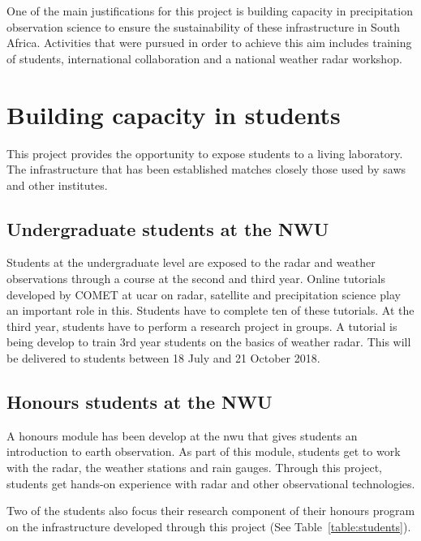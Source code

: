 \documentclass{wrcreport}
\begin{document}
One of the main justifications for this project is building capacity in precipitation observation science to ensure the sustainability of these infrastructure in South Africa. Activities that were pursued in order to achieve this aim includes training of students, international collaboration and a national weather radar workshop.

\section{Building capacity in students}

This project provides the opportunity to expose students to a living laboratory. The infrastructure that has been established matches closely those used by \gls{saws} and other institutes. 

\subsection{Undergraduate students at the NWU}

Students at the undergraduate level are exposed to the radar and weather observations through a course at the second and third year. Online tutorials developed by COMET at \gls{ucar} on radar, satellite and precipitation science play an important role in this. Students have to complete ten of these tutorials. At the third year, students have to perform a research project in groups. A tutorial is being develop to train 3rd year students on the basics of weather radar. This will be delivered to students between 18 July and 21 October 2018.

\subsection{Honours students at the NWU}

A honours module has been develop at the \gls{nwu} that gives students an introduction to earth observation. As part of this module, students get to work with the radar, the weather stations and rain gauges. Through this project, students get hands-on experience with radar and other observational technologies.

Two of the students also focus their research component of their honours program on the infrastructure developed through this project (See Table~\ref{table:students}).
\end{document}
